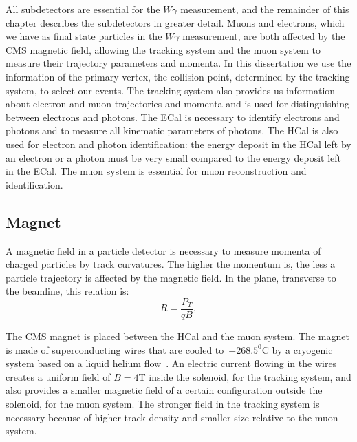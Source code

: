All subdetectors are essential for the $W\gamma$ measurement, and the remainder of this chapter describes the subdetectors in greater detail. Muons and electrons, which we have as final state particles in the $W\gamma$ measurement, are both affected by the CMS magnetic field, allowing the tracking system and the muon system to measure their trajectory parameters and momenta. In this dissertation we use the information of the primary vertex, the collision point, determined by the tracking system, to select our events. The tracking system also provides us information about electron and muon trajectories and momenta and is used for distinguishing between electrons and photons. The ECal is necessary to identify electrons and photons and to measure all kinematic parameters of photons. The HCal is also used for electron and photon identification: the energy deposit in the HCal left by an electron or a photon must be very small compared to the energy deposit left in the ECal. The muon system is essential for muon reconstruction and identification.

\clearpage

\subsection{Magnet}

A magnetic field in a particle detector is necessary to measure momenta of charged particles by track curvatures. The higher the momentum is, the less a particle trajectory is affected by the magnetic field. In the plane, transverse to the beamline, this relation is:
\begin{equation}
  R=\frac{P_T}{qB},
\end{equation} 

The CMS magnet is placed between the HCal and the muon system. The magnet is made of superconducting wires that are cooled to~$-268.5^0$C by a cryogenic system based on a liquid helium flow~\cite{ref_MagnetCryo}. An electric current flowing in the wires creates a uniform field of $B=4$T inside the solenoid, for the tracking system, and also provides a smaller magnetic field of a certain configuration outside the solenoid, for the muon system. The stronger field in the tracking system is necessary because of higher track density and smaller size relative to the muon system.

